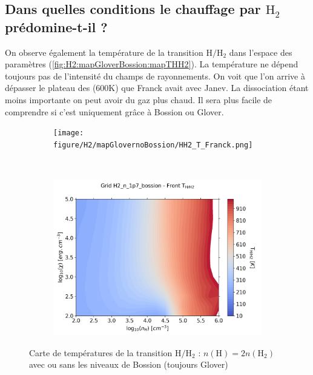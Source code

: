 \subsection{Dans quelles conditions le chauffage par $\mathrm{H}_2$ prédomine-t-il ?}

On observe également la température de la transition $\mathrm{H}/\mathrm{H}_2$ dans l'espace des paramètres (\autoref{fig:H2:mapGloverBossion:mapTHH2}). La température ne dépend toujours pas de l'intensité du champs de rayonnements. On voit que l'on arrive à dépasser le plateau des (600K) que Franck avait avec Janev. La dissociation étant moins importante on peut avoir du gaz plus chaud. Il sera plus facile de comprendre si c'est uniquement grâce à Bossion ou Glover. \newline 

\begin{figure}[th!]
    \centering
    \begin{subfigure}[t]{0.45\textwidth} %
        \centering \texttt{[image: figure/H2/mapGlovernoBossion/HH2\_T\_Franck.png]}
        \caption{}
    \end{subfigure}
    ~ 
    \begin{subfigure}[t]{0.45\textwidth}
        \centering \includegraphics[trim = {0 0 0 0},clip,width=1\textwidth]{figure/H2/mapGloverBossion/HH2_T_Franck.png}
        \caption{}
    \end{subfigure}
    \caption{Carte de températures de la transition $\mathrm{H}/\mathrm{H}_2$ : $n(\mathrm{H})=2n(\mathrm{H}_2)$ avec ou sans les niveaux de Bossion (toujours Glover)}
    \label{fig:H2:mapGloverBossion:mapTHH2}
\end{figure}

